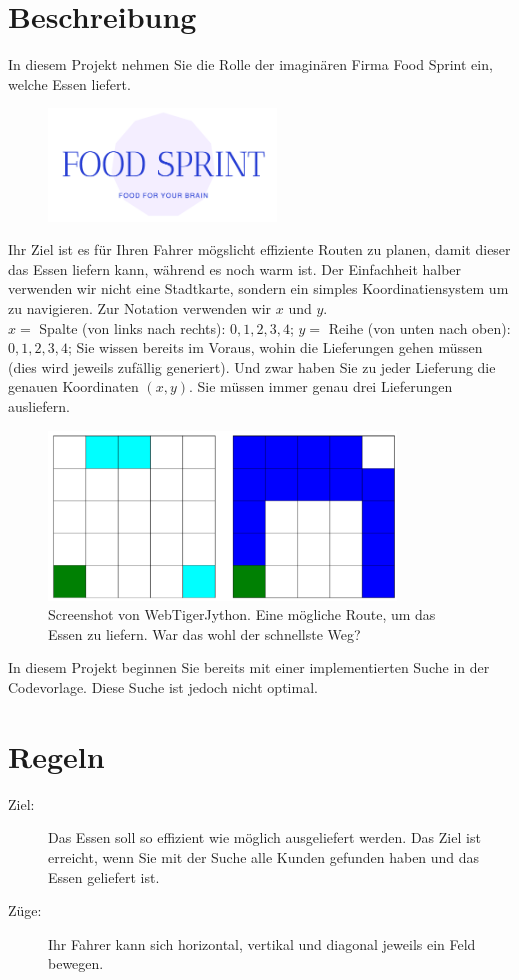 \documentclass[a4paper,11pt,german,notitlepage]{report}
\begin{document}
\section*{Beschreibung}
In diesem Projekt nehmen Sie die Rolle der imaginären Firma Food Sprint ein, welche Essen liefert.
\begin{figure}[h!]
    \centering
    \includegraphics[height=3cm]{logo.png}  
\end{figure}
Ihr Ziel ist es für Ihren Fahrer mögslicht effiziente Routen zu planen, damit dieser das Essen liefern kann, während es noch warm ist.
Der Einfachheit halber verwenden wir nicht eine Stadtkarte, sondern ein simples Koordinatiensystem um zu navigieren.
Zur Notation verwenden wir $x$ und $y$.\\
$x =$ Spalte (von links nach rechts): $0, 1, 2, 3, 4$;
$y =$ Reihe (von unten nach oben): $0, 1, 2, 3, 4$;
Sie wissen bereits im Voraus, wohin die Lieferungen gehen müssen (dies wird jeweils zufällig generiert).
Und zwar haben Sie zu jeder Lieferung die genauen Koordinaten $(x,y)$.
Sie müssen immer genau drei Lieferungen ausliefern.
\begin{figure}[h!]
    \centering
    \includegraphics[height=4.5cm]{food_service.png}  
    \caption{Screenshot von WebTigerJython. Eine mögliche Route, um das Essen zu liefern. War das wohl der schnellste Weg?}
\end{figure}
In diesem Projekt beginnen Sie bereits mit einer implementierten Suche in der Codevorlage.
Diese Suche ist jedoch nicht optimal.

\section*{Regeln}
\begin{description}
    \item[Ziel:] Das Essen soll so effizient wie möglich ausgeliefert werden. Das Ziel ist erreicht, wenn Sie mit der Suche alle Kunden gefunden haben und das Essen geliefert ist.
    \item[Züge:] Ihr Fahrer kann sich horizontal, vertikal und diagonal jeweils ein Feld bewegen.
\end{description}
\end{document}
